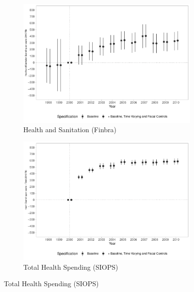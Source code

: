 \begin{figure}[h!]
    \begin{center}
    \caption{Effects on Public Health Spending per capita}\label{fig:6}
    \begin{subfigure}{0.48\textwidth}
        \caption{\scriptsize Health and Sanitation (Finbra)}\label{fig:6a}
        \centering
\includegraphics[width=\textwidth]{plots/finbra_desp_saude_san_pcapita_dist_ec29_baseline_dist_ec29_baseline_6.pdf}
    \end{subfigure}
    \begin{subfigure}{0.48\textwidth}
        \centering
        \caption{\scriptsize Total Health Spending (SIOPS)}\label{fig:6b}
        \includegraphics[width=\textwidth]{plots/siops_despsaude_pcapita_dist_ec29_baseline_dist_ec29_baseline_6.pdf}

\end{subfigure}
\end{center}
\end{figure}
